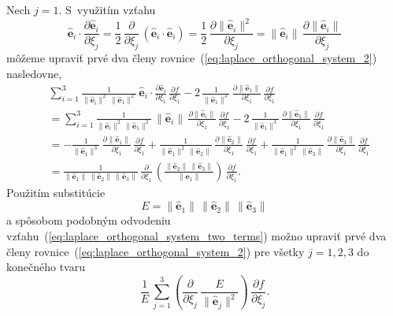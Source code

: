 \documentclass[a4paper, 12pt]{book}
\let\vec\mathbf
\begin{document}
Nech $j = 1$.  S~využitím vzťahu
%
\begin{equation}
\hat{\vec e}_i \cdot \frac{\partial \hat{\vec e}_i}{\partial \xi_j} 
= \frac{1}{2} \, \frac{\partial}{\partial \xi_j} \, \left( \hat{\vec e}_i \cdot 
\hat{\vec e}_i \right) = \frac{1}{2} \, \frac{\partial \| \hat{\vec e}_i 
\|^2}{\partial \xi_j} = \| \hat{\vec e}_i \| \, \frac{\partial \| \hat{\vec 
e}_i \|}{\partial \xi_j}
\end{equation}
%
môžeme upraviť prvé dva členy rovnice~(\ref{eq:laplace_orthogonal_system_2}) 
nasledovne,
%
\begin{equation}
\label{eq:laplace_orthogonal_system_two_terms}
\begin{split}
&\sum_{i = 1}^{3} \frac{1}{\| \hat{\vec e}_i \|^2 \, \| \hat{\vec e}_1 \|^2} \, 
\hat{\vec e}_i \cdot \frac{\partial \hat{\vec e}_i}{\partial \xi_1} \, 
\frac{\partial f}{\partial \xi_1}
- 2\, \frac{1}{\|\hat{\vec e}_1 \|^3} \, \frac{\partial \| \hat{\vec e}_1 
\|}{\partial \xi_1} \, \frac{\partial f}{\partial \xi_1}\\
%
&= \sum_{i = 1}^{3} \frac{1}{\| \hat{\vec e}_i \|^2 \, \| \hat{\vec e}_1 \|^2} 
\, \| \hat{\vec e}_i \| \, \frac{\partial \| \hat{\vec e}_i \|}{\partial \xi_1} 
\, \frac{\partial f}{\partial \xi_1}
- 2\, \frac{1}{\|\hat{\vec e}_1 \|^3} \, \frac{\partial \| \hat{\vec e}_1 
\|}{\partial \xi_1} \, \frac{\partial f}{\partial \xi_1}\\
%
&= -\frac{1}{\| \hat{\vec e}_1 \|^3} \, \frac{\partial \| \hat{\vec e}_1 
\|}{\partial \xi_1} \, \frac{\partial f}{\partial \xi_1} + \frac{1}{\| 
\hat{\vec e}_1 \|^2 \, \| \hat{\vec e}_2 \|} \, \frac{\partial \| \hat{\vec 
e}_2 \|}{\partial \xi_1} \, \frac{\partial f}{\partial \xi_1} + \frac{1}{\| 
\hat{\vec e}_1 \|^2 \, \| \hat{\vec e}_3 \|} \, \frac{\partial \| \hat{\vec 
e}_3 \|}{\partial \xi_1} \, \frac{\partial f}{\partial \xi_1}\\
%
&= \frac{1}{\| \hat{\vec e}_1 \| \, \| \hat{\vec e}_2 \| \, \| \hat{\vec e}_3 
\|} \, \frac{\partial}{\partial \xi_1} \, \left( \frac{\| \hat{\vec e}_2 \| \, 
\| \hat{\vec e}_3 \|}{\| \hat{\vec e}_1 \|} \right) \, \frac{\partial 
f}{\partial \xi_1}{.}
\end{split}
\end{equation}
%
Použitím substitúcie
%
\begin{equation}
\label{eq:e_laplace}
E = \| \hat{\vec e}_1  \| \, \| \hat{\vec e}_2  \| \, \| \hat{\vec e}_3  \|
\end{equation}
%
a spôsobom podobným odvodeniu 
vzťahu~(\ref{eq:laplace_orthogonal_system_two_terms}) možno upraviť prvé dva 
členy rovnice~(\ref{eq:laplace_orthogonal_system_2}) pre všetky $j = 1, 2, 3$ 
do konečného tvaru
%
\begin{equation}
\label{eq:laplace_orthogonal_system_two_terms_final}
\frac{1}{E} \, \sum_{j = 1}^3 \left( \frac{\partial}{\partial \xi_j} \, 
\frac{E}{\| \hat{\vec e}_j \|^2}\right) \, \frac{\partial f}{\partial \xi_j}{.}
\end{equation}
\end{document}
